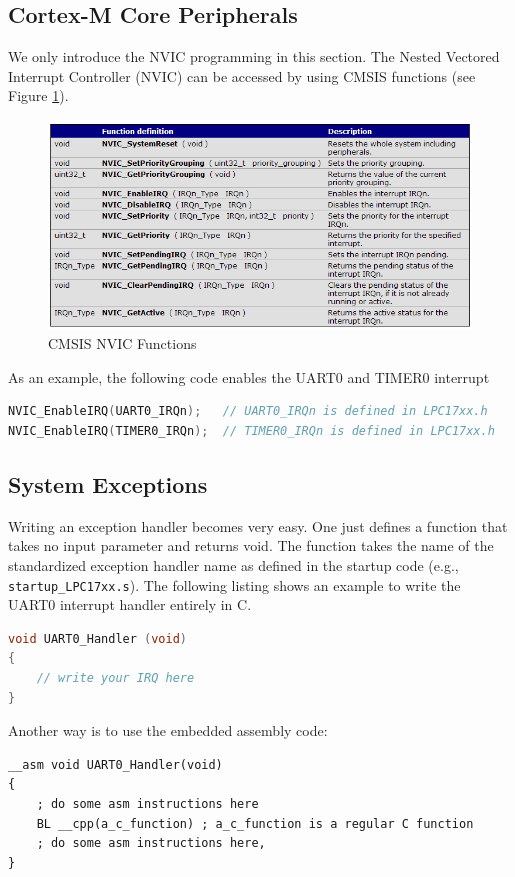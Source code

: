 \subsection{Cortex-M Core Peripherals}
We only introduce the NVIC programming in this section. 
The Nested Vectored Interrupt Controller (NVIC) can be accessed by using CMSIS functions (see Figure \ref{fig_cmsis_nvic}).
\begin{figure}[ht!]
\centerline{\includegraphics[width=5.5in]{figure/CMSIS_nvic}}
\caption[CMSIS NVIC Functions]{CMSIS NVIC Functions\cite{keil.mdk.primer}} 
\label{fig_cmsis_nvic}
\end{figure}
As an example, the following code enables the UART0 and TIMER0 interrupt 
\begin{lstlisting}[language=C]
NVIC_EnableIRQ(UART0_IRQn);   // UART0_IRQn is defined in LPC17xx.h
NVIC_EnableIRQ(TIMER0_IRQn);  // TIMER0_IRQn is defined in LPC17xx.h
\end{lstlisting}

\subsection{System Exceptions}
\label{sec_exception}
Writing an exception handler becomes very easy. One just defines a function that takes no input parameter and returns void. The function takes the name of the standardized exception handler name as defined in the startup code (e.g., \verb|startup_LPC17xx.s|). The following listing shows an example to write the UART0 interrupt handler entirely in C. \\
\begin{lstlisting}[language=C]
void UART0_Handler (void) 
{
    // write your IRQ here
}
\end{lstlisting}

\clearpage
Another way is to use the embedded assembly code: \\
\begin{lstlisting}[style=asm]
__asm void UART0_Handler(void)
{
    ; do some asm instructions here
    BL __cpp(a_c_function) ; a_c_function is a regular C function
    ; do some asm instructions here, 
}
\end{lstlisting}


